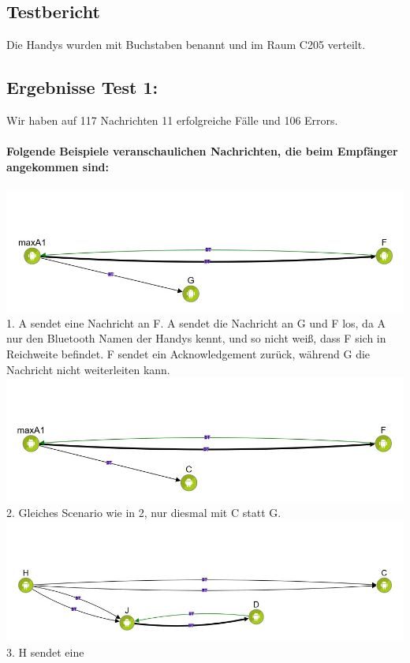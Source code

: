 \clearpage\subsection{Testbericht}\label{testbericht}

Die Handys wurden mit Buchstaben benannt und im Raum C205 verteilt.

\clearpage\subsection{Ergebnisse Test 1:}\label{ergebnisse-test-1}

Wir haben auf 117 Nachrichten 11 erfolgreiche Fälle und 106 Errors.
\\\\
\textbf{Folgende Beispiele veranschaulichen Nachrichten, die beim
Empfänger angekommen sind:}
\\\\
\includegraphics[width=1.0\textwidth]{belege/grosstests/Bilder/Erfolg4.jpg}\\
1. A sendet eine Nachricht an F. A sendet die Nachricht an G und F los, da A nur den
Bluetooth Namen der Handys kennt, und so nicht weiß, dass F sich in
Reichweite befindet. F sendet ein Acknowledgement zurück, während G die
Nachricht nicht weiterleiten kann.\\
\includegraphics[width=1.0\textwidth]{belege/grosstests/Bilder/Erfolg3.jpg}\\
2. Gleiches Scenario wie in 2, nur diesmal mit C statt G.\\
\includegraphics[width=1.0\textwidth]{belege/grosstests/Bilder/Erfolg2.jpg}\\ 3. H sendet eine
